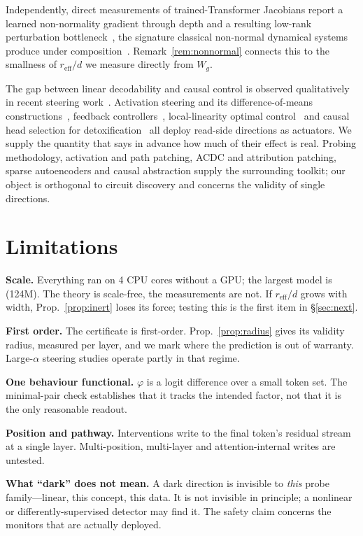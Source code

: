 \documentclass[11pt]{article}
\theoremstyle{definition}
\theoremstyle{remark}
\newcommand{\Wg}{W_{g}}
\newcommand{\reff}{r_{\mathrm{eff}}}
\begin{document}
Independently, direct measurements of trained-Transformer Jacobians report a
learned non-normality gradient through depth and a resulting low-rank
perturbation bottleneck~\cite{nonnormalresidual2026,transientreserves2026},
the signature classical non-normal dynamical systems produce under
composition~\cite{trefethen1993}. Remark~\ref{rem:nonnormal} connects this to
the smallness of $\reff/d$ we measure directly from $\Wg$.

The gap between linear decodability and causal control is observed
qualitatively in recent steering work~\cite{langaxis2026}. Activation steering
and its difference-of-means constructions~\cite{actadd,caa}, feedback
controllers~\cite{feedback2025}, local-linearity optimal control~\cite{locallin2026}
and causal head selection for detoxification~\cite{causaldetox2026} all deploy
read-side directions as actuators. We supply the quantity that says in advance
how much of their effect is real. Probing methodology, activation and path
patching, ACDC and attribution patching, sparse autoencoders and causal
abstraction supply the surrounding toolkit; our object is orthogonal to circuit
discovery and concerns the validity of single directions.

\section{Limitations}
\label{sec:limits}

\textbf{Scale.} Everything ran on 4 CPU cores without a GPU; the largest model
is \EthreeModel{} (124M). The theory is scale-free, the measurements are not. If
$\reff/d$ grows with width, Prop.~\ref{prop:inert} loses its force; testing this
is the first item in \S\ref{sec:next}.

\textbf{First order.} The certificate is first-order.
Prop.~\ref{prop:radius} gives its validity radius, measured per layer, and we
mark where the prediction is out of warranty. Large-$\alpha$ steering studies
operate partly in that regime.

\textbf{One behaviour functional.} $\varphi$ is a logit difference over a small
token set. The minimal-pair check establishes that it tracks the intended
factor, not that it is the only reasonable readout.

\textbf{Position and pathway.} Interventions write to the final token's residual
stream at a single layer. Multi-position, multi-layer and attention-internal
writes are untested.

\textbf{What ``dark'' does not mean.} A dark direction is invisible to
\emph{this} probe family---linear, this concept, this data. It is not invisible
in principle; a nonlinear or differently-supervised detector may find it. The
safety claim concerns the monitors that are actually deployed.
\end{document}
